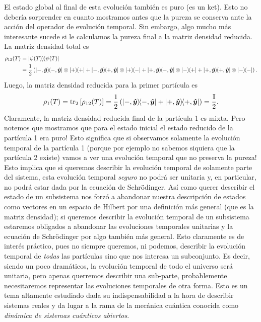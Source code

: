 \documentclass[10pt, a4paper]{article}
\numberwithin{equation}{subsection}
\begin{document}
El estado global al final de esta evolución también es puro (es un ket). Esto
no debería sorprender en cuanto mostramos antes que la pureza se conserva ante
la acción del operador de evolución temporal. Sin embargo, algo mucho más
interesante sucede si le calculamos la pureza final a la matriz densidad
reducida. La matriz densidad total es
\begin{align}
  \rho_{12}(T)
  &= \projector{\psi(T)} \nonumber \\
  &= \frac{1}{2}\left( \ketbra{-,\vers{y}}{-,\vers{y}} \tensor \ketbra{+}{+} +
    \ketbra{-,\vers{y}}{+,\vers{y}} \tensor \ketbra{+}{-} +
    \ketbra{+,\vers{y}}{-,\vers{y}} \tensor \ketbra{-}{+} +
    \ketbra{+,\vers{y}}{+,\vers{y}} \tensor \ketbra{-}{-} \right).
\end{align}
Luego, la matriz densidad reducida para la primer partícula es
\begin{equation}
  \rho_{1}(T)
  = \tr_2\left[\rho_{12}(T)\right]
  = \frac{1}{2}\left( \ketbra{-,\vu*{y}}{-,\vu*{y}} +
    \ketbra{+,\vu*{y}}{+,\vu*{y}} \right)
  = \frac{\mathbb{I}}{2}.
\end{equation}
Claramente, la matriz densidad reducida final de la partícula 1 es mixta. Pero
notemos que mostramos que para el estado inicial el estado reducido de la
partícula 1 era puro! Esto significa que si observamos solamente la evolución
temporal de la partícula 1 (porque por ejemplo no sabemos siquiera que la
partícula 2 existe) vamos a ver una evolución temporal que no preserva la
pureza! Esto implica que si queremos describir la evolución temporal de
solamente parte del sistema, esta evolución temporal \emph{seguro} no podrá ser
unitaria y, en particular, no podrá estar dada por la ecuación de Schrödinger.
Así como querer describir el estado de un subsistema nos forzó a abandonar
nuestra descripción de estados como vectores en un espacio de Hilbert por una
definición más general (que es la matriz densidad); si queremos describir la
evolución temporal de un subsistema estaremos obligados a abandonar las
evoluciones temporales unitarias y la ecuación de Schrödinger por algo también
más general. Esto claramente es de interés práctico, pues no siempre queremos,
ni podemos, describir la evolución temporal de \emph{todas} las partículas sino
que nos interesa un subconjunto. Es decir, siendo un poco dramáticos, la
evolución temporal de todo el universo será unitaria, pero apenas querremos
describir una sub-parte, probablemente necesitaremos representar las evoluciones
temporales de otra forma. Esto es un tema altamente estudiado dada su
indispensabilidad a la hora de describir sistemas reales y da lugar a la rama
de la mecánica cuántica conocida como \emph{dinámica de sistemas cuánticos
abiertos}.

\end{document}
